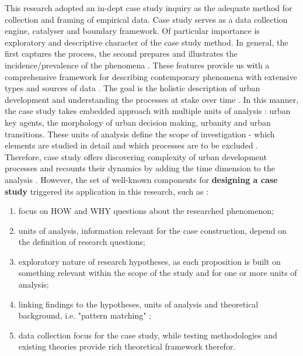 \documentclass[11pt]{report}
\begin{document}
This research adopted an in-dept case study inquiry as the adequate method for collection and framing of empirical data. Case study serves as a data collection engine, catalyser and boundary framework. Of particular importance is exploratory and descriptive character of the case study method. In general, the first captures the process, the second prepares and illustrates the incidence/prevalence of the phenomena . These features provide us with a comprehensive framework for describing contemporary phenomena with extensive types and sources of data . The goal is the holistic description of urban development and understanding the processes at stake over time . In this manner, the case study takes embedded approach with multiple units of analysis : urban key agents, the morphology of urban decision making, urbanity and urban transitions. These units of analysis define the scope of investigation - which elements are studied in detail and which processes are to be excluded .
\\
Therefore, case study offers discovering complexity of urban development processes and recounts their dynamics by adding the time dimension to the analysis . However, the set of well-known components for \textbf{designing a case study} triggered its application in this research, such as :
\begin{enumerate}
\item focus on HOW and WHY questions about the researched phenomenon;
\item units of analysis, information relevant for the case construction, depend on the definition of research questions;
\item exploratory nature of research hypotheses, as each proposition is built on something relevant within the scope of the study and for one or more units of analysis;
\item linking findings to the hypotheses, units of analysis and theoretical background, i.e. "pattern matching" ;
\item data collection focus for the case study, while testing methodologies and existing theories provide rich theoretical framework therefor.
\end{enumerate}
\end{document}
